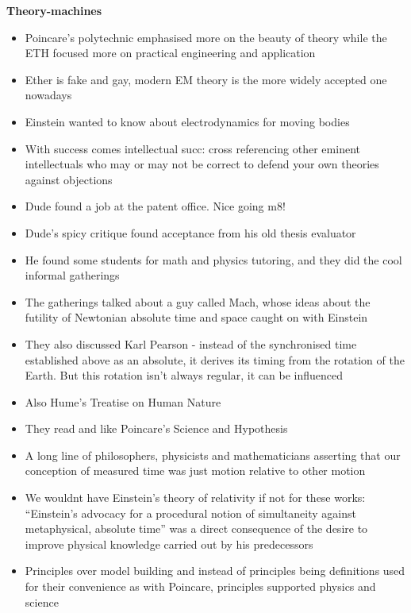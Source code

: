\documentclass[a4paper]{article}
\begin{document}
\noindent\textbf{Theory-machines}
\begin{itemize}
	\item Poincare's polytechnic emphasised more on the beauty of theory while the ETH focused more on practical engineering and application
	\item Ether is fake and gay, modern EM theory is the more widely accepted one nowadays
	\item Einstein wanted to know about electrodynamics for moving bodies
	\item With success comes intellectual succ: cross referencing other eminent intellectuals who may or may not be correct to defend your own theories against objections
	\item Dude found a job at the patent office. Nice going m8!
	\item Dude's spicy critique found acceptance from his old thesis evaluator
	\item He found some students for math and physics tutoring, and they did the cool informal gatherings
	\item The gatherings talked about a guy called Mach, whose ideas about the futility of Newtonian absolute time and space caught on with Einstein
	\item They also discussed Karl Pearson - instead of the synchronised time established above as an absolute, it derives its timing from the rotation of the Earth. But this rotation isn’t always regular, it can be influenced
	\item Also Hume's Treatise on Human Nature
	\item They read and like Poincare's Science and Hypothesis
	\item A long line of philosophers, physicists and mathematicians asserting that our conception of measured time was just motion relative to other motion
	\item We wouldnt have Einstein's theory of relativity if not for these works: ``Einstein's advocacy for a  procedural notion of simultaneity against metaphysical, absolute time'' was a direct consequence of the desire to improve physical knowledge carried out by his predecessors
	\item Principles over model building and instead of principles being definitions used for their convenience as with Poincare, principles supported physics and science
\end{itemize}

\medskip
\end{document}
